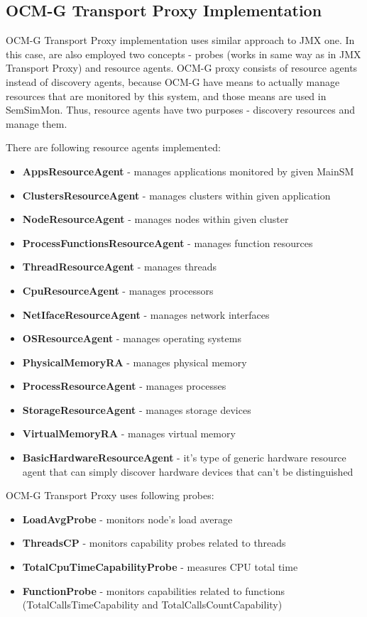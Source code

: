\subsection{OCM-G Transport Proxy Implementation}

OCM-G Transport Proxy implementation uses similar approach to JMX one. In this case, are also employed two concepts - probes (works in same way as in JMX Transport Proxy) and resource agents. OCM-G proxy consists of resource agents instead of discovery agents, because OCM-G have means to actually manage resources that are monitored by this system, and those means are used in SemSimMon. Thus, resource agents have two purposes - discovery resources and manage them.

There are following resource agents implemented:

\begin{itemize} 
  \item{\bf{AppsResourceAgent}} - manages applications monitored by given MainSM
  \item{\bf{ClustersResourceAgent}} - manages clusters within given application
  \item{\bf{NodeResourceAgent}} - manages nodes within given cluster
  \item{\bf{ProcessFunctionsResourceAgent}} - manages function resources
  \item{\bf{ThreadResourceAgent}} - manages threads
  \item{\bf{CpuResourceAgent}} - manages processors
  \item{\bf{NetIfaceResourceAgent}} - manages network interfaces
  \item{\bf{OSResourceAgent}} - manages operating systems
  \item{\bf{PhysicalMemoryRA}} - manages physical memory
  \item{\bf{ProcessResourceAgent}} - manages processes
  \item{\bf{StorageResourceAgent}} - manages storage devices
  \item{\bf{VirtualMemoryRA}} - manages virtual memory
  \item{\bf{BasicHardwareResourceAgent}} - it\rq{}s type of generic hardware resource agent that can simply discover hardware devices that can\rq{}t be distinguished
\end{itemize} 
  
OCM-G Transport Proxy uses following probes:

\begin{itemize} 
  \item{\bf{LoadAvgProbe}} - monitors node\rq{}s load average 
  \item{\bf{ThreadsCP}} - monitors capability probes related to threads
  \item{\bf{TotalCpuTimeCapabilityProbe}} - measures CPU total time
  \item{\bf{FunctionProbe}} - monitors capabilities related to functions (TotalCallsTimeCapability and TotalCallsCountCapability)
\end{itemize} 

